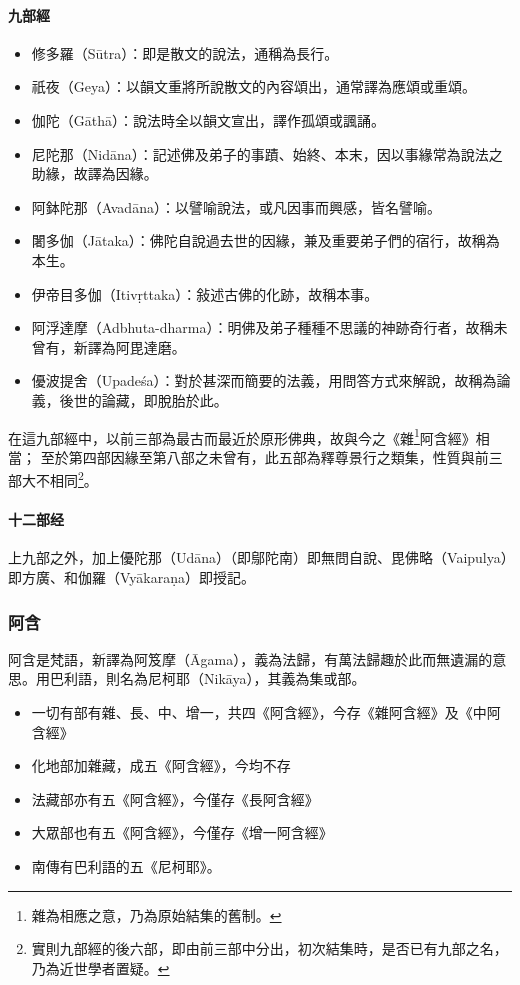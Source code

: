 \paragraph{九部經}
\begin{itemize}
  \item 修多羅（Sūtra）：即是散文的說法，通稱為長行。
  \item 祇夜（Geya）：以韻文重將所說散文的內容頌出，通常譯為應頌或重頌。
  \item 伽陀（Gāthā）：說法時全以韻文宣出，譯作孤頌或諷誦。
  \item 尼陀那（Nidāna）：記述佛及弟子的事蹟、始終、本末，因以事緣常為說法之助緣，故譯為因緣。
  \item 阿鉢陀那（Avadāna）：以譬喻說法，或凡因事而興感，皆名譬喻。
  \item 闍多伽（Jātaka）：佛陀自說過去世的因緣，兼及重要弟子們的宿行，故稱為本生。
  \item 伊帝目多伽（Itivṛttaka）：敍述古佛的化跡，故稱本事。
  \item 阿浮達摩（Adbhuta-dharma）：明佛及弟子種種不思議的神跡奇行者，故稱未曾有，新譯為阿毘達磨。
  \item 優波提舍（Upadeśa）：對於甚深而簡要的法義，用問答方式來解說，故稱為論義，後世的論藏，即脫胎於此。
\end{itemize}
在這九部經中，以前三部為最古而最近於原形佛典，故與今之《雜\footnote{雜為相應之意，乃為原始結集的舊制。}阿含經》相當；
至於第四部因緣至第八部之未曾有，此五部為釋尊景行之類集，性質與前三部大不相同\footnote{實則九部經的後六部，即由前三部中分出，初次結集時，是否已有九部之名，乃為近世學者置疑。}。
\paragraph{十二部经}
上九部之外，加上優陀那（Udāna）（即鄔陀南）即無問自說、毘佛略（Vaipulya）即方廣、和伽羅（Vyākaraṇa）即授記。

\subsubsection{阿含}
阿含是梵語，新譯為阿笈摩（Āgama），義為法歸，有萬法歸趣於此而無遺漏的意思。用巴利語，則名為尼柯耶（Nikāya），其義為集或部。
\begin{itemize}
  \item 一切有部有雜、長、中、增一，共四《阿含經》，今存《雜阿含經》及《中阿含經》
  \item 化地部加雜藏，成五《阿含經》，今均不存
  \item 法藏部亦有五《阿含經》，今僅存《長阿含經》
  \item 大眾部也有五《阿含經》，今僅存《增一阿含經》
  \item 南傳有巴利語的五《尼柯耶》。
\end{itemize}
